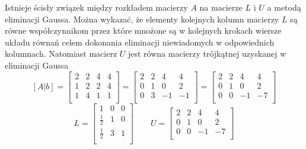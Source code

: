 \documentclass[a4paper,12pt]{article}
\theoremstyle{definition}
\begin{document}
Istnieje ścisły związek między rozkładem macierzy $A$ na macierze $L$ i $U$ a metodą eliminacji Gaussa. Można wykazać, że elementy kolejnych kolumn macierzy $L$ są równe współczynnikom przez które mnożone są w kolejnych krokach wiersze układu równań celem dokonania eliminacji niewiadomych w odpowiednich kolumnach. Natomiast macierz $U$ jest równa macierzy trójkątnej uzyskanej w eliminacji Gaussa
$$
	[A|b] =  \left[
	 \begin{array}{rrrr}
	  2 & 2 & 4 & 4\\
	  1 & 2 & 2 & 4\\
	  1 & 4 & 1 & 1\\
	 \end{array}
	 \right] 
	 =
	 \left[
	 \begin{array}{rrrr}
	 2 & 2 & 4 & 4\\
	 0 & 1 & 0 & 2\\
	 0 & 3 & -1 & -1\\
	 \end{array}
	 \right] 
	 =
	 \left[
	 \begin{array}{rrrr}
	 2 & 2 & 4 & 4\\
	 0 & 1 & 0 & 2\\
	 0 & 0 & -1 & -7\\
	 \end{array}
	 \right] 
$$
$$
	L = 
	\left[
	\begin{array}{rrr}
	1 & 0 & 0\\
	\frac{1}{2} & 1 & 0\\
	\frac{1}{2} & 3 & 1\\
	\end{array}
	\right] 	 
	 \qquad
	 U =
	 \left[
	 \begin{array}{rrrr}
	 2 & 2 & 4 & 4\\
	 0 & 1 & 0 & 2\\
	 0 & 0 & -1 & -7\\
	 \end{array}
	 \right] 	 
$$
\end{document}
